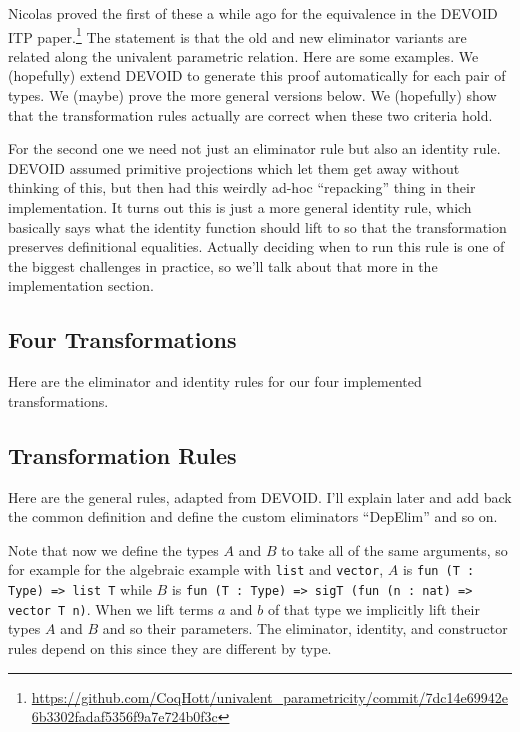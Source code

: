 Nicolas proved the first of these a while ago
for the equivalence in the DEVOID ITP paper.\footnote{\url{https://github.com/CoqHott/univalent_parametricity/commit/7dc14e69942e6b3302fadaf5356f9a7e724b0f3c}}
The statement is that the old and new eliminator variants are related along the univalent parametric relation.
Here are some examples.
We (hopefully) extend DEVOID to generate this proof automatically for each pair of types.
We (maybe) prove the more general versions below. 
We (hopefully) show that the transformation rules actually are correct when these two criteria hold.

For the second one we need not just an eliminator rule but also an identity rule.
DEVOID assumed primitive projections which let them get away without thinking of this,
but then had this weirdly ad-hoc ``repacking'' thing in their implementation.
It turns out this is just a more general identity rule, which basically says what
the identity function should lift to so that the transformation preserves definitional equalities.
Actually deciding when to run this rule is one of the biggest challenges in practice,
so we'll talk about that more in the implementation section.

\subsection{Four Transformations}

Here are the eliminator and identity rules for our four implemented transformations.

\subsection{Transformation Rules}

Here are the general rules, adapted from DEVOID.
I'll explain later and add back the common definition and define the custom eliminators ``DepElim'' and so on.

Note that now we define the types $A$ and $B$ to take all of the same arguments, so for example for the algebraic
example with \lstinline{list} and \lstinline{vector}, $A$ is \lstinline{fun (T : Type) => list T} while $B$
is \lstinline{fun (T : Type) => sigT (fun (n : nat) => vector T n)}. When we lift terms $a$ and $b$ of that type
we implicitly lift their types $A$ and $B$ and so their parameters. The eliminator, identity, and constructor rules
depend on this since they are different by type.

